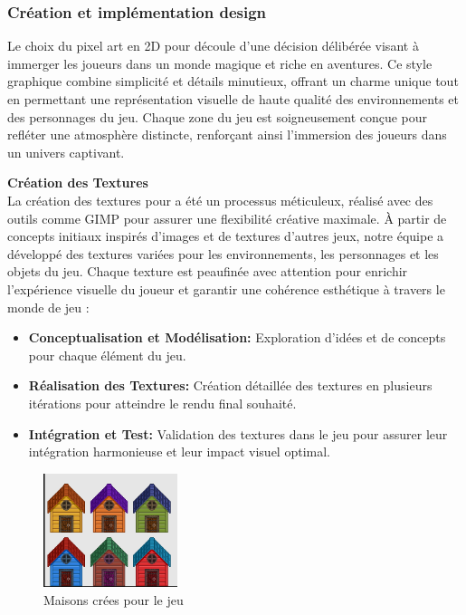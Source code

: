 \subsubsection{Création et implémentation design}





Le choix du pixel art en 2D pour \gameName découle d'une décision délibérée visant à immerger les joueurs dans un monde magique et riche en aventures.
Ce style graphique combine simplicité et détails minutieux, offrant un charme unique tout en permettant une représentation visuelle de haute qualité des environnements et 
des personnages du jeu.
Chaque zone du jeu est soigneusement conçue pour refléter une atmosphère distincte, renforçant ainsi l'immersion des joueurs dans un univers captivant.

\textbf{Création des Textures}
\\

La création des textures pour \gameName a été un processus méticuleux, réalisé avec des outils comme GIMP pour assurer une flexibilité créative maximale.
À partir de concepts initiaux inspirés d'images et de textures d'autres jeux, notre équipe a développé des textures variées pour les environnements, les personnages
 et les objets du jeu.
Chaque texture est peaufinée avec attention pour enrichir l'expérience visuelle du joueur et garantir une cohérence esthétique à travers le monde de jeu :
\\

\begin{itemize}

      \item \textbf{Conceptualisation et Modélisation:} Exploration d'idées et de concepts pour chaque élément du jeu.
            \\

      \item \textbf{Réalisation des Textures:} Création détaillée des textures en plusieurs itérations pour atteindre le rendu final souhaité.
            \\

      \item \textbf{Intégration et Test:} Validation des textures dans le jeu pour assurer leur intégration harmonieuse et leur impact visuel optimal.
            \\

\end{itemize}

\begin{figure}[H]
      \centering
      \includegraphics[width=0.35\textwidth]{assets/maisns.png}
      \caption{Maisons crées pour le jeu}
      \label{fig:website1}
  \end{figure}

